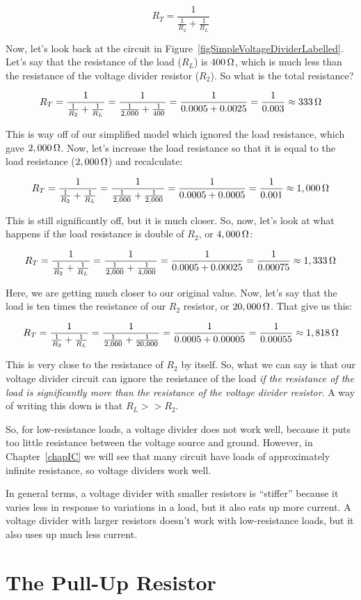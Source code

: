 $$ R_T = \frac{1}{\frac{1}{R_2} + \frac{1}{R_L}} $$

Now, let's look back at the circuit in Figure~\ref{figSimpleVoltageDividerLabelled}.
Let's say that the resistance of the load ($R_L$) is $400\,\si{\ohm}$, which is much less than the resistance of the voltage divider resistor ($R_2$).
So what is the total resistance?

$$ R_T = \frac{1}{\frac{1}{R_2} + \frac{1}{R_L}} = \frac{1}{\frac{1}{2,000} + \frac{1}{400}} = \frac{1}{0.0005 + 0.0025} = \frac{1}{0.003} \approx 333\,\si{\ohm} $$

This is way off of our simplified model which ignored the load resistance, which gave $2,000\,\si{\ohm}$.
Now, let's increase the load resistance so that it is equal to the load resistance ($2,000\,\si{\ohm}$) and recalculate:

$$ R_T = \frac{1}{\frac{1}{R_2} + \frac{1}{R_L}} = \frac{1}{\frac{1}{2,000} + \frac{1}{2,000}} = \frac{1}{0.0005 + 0.0005} = \frac{1}{0.001} \approx 1,000\,\si{\ohm} $$

This is still significantly off, but it is much closer.
So, now, let's look at what happens if the load resistance is double of $R_2$, or $4,000\,\si{\ohm}$:

$$ R_T = \frac{1}{\frac{1}{R_2} + \frac{1}{R_L}} = \frac{1}{\frac{1}{2,000} + \frac{1}{4,000}} = \frac{1}{0.0005 + 0.00025} = \frac{1}{0.00075} \approx 1,333\,\si{\ohm} $$

Here, we are getting much closer to our original value.  Now, let's say that the load is ten times the resistance of our $R_2$ resistor, or $20,000\,\si{\ohm}$.  That give us this:

$$ R_T = \frac{1}{\frac{1}{R_2} + \frac{1}{R_L}} = \frac{1}{\frac{1}{2,000} + \frac{1}{20,000}} = \frac{1}{0.0005 + 0.00005} = \frac{1}{0.00055} \approx 1,818\,\si{\ohm} $$

This is very close to the resistance of $R_2$ by itself.
So, what we can say is that our voltage divider circuit can ignore the resistance of the load \emph{if the resistance of the load is significantly more than the resistance of the voltage divider resistor}.
A way of writing this down is that $R_L >> R_2$.

So, for low-resistance loads, a voltage divider does not work well, because it puts too little resistance between the voltage source and ground.
However, in Chapter~\ref{chapIC} we will see that many circuit have loads of approximately infinite resistance, so voltage dividers work well.

In general terms, a voltage divider with smaller resistors is ``stiffer'' because it varies less in response to variations in a load, but it also eats up more current.
A voltage divider with larger resistors doesn't work with low-resistance loads, but it also uses up much less current.

\section{The Pull-Up Resistor}
\label{secPullUpResistor}
